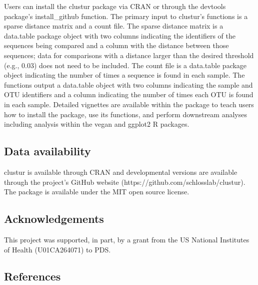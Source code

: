 \documentclass[
  11pt,
]{article}
\begin{document}
Users can install the clustur package via CRAN or through the devtools
package's install\_github function. The primary input to clustur's
functions is a sparse distance matrix and a count file. The sparse
distance matrix is a data.table package object with two columns
indicating the identifiers of the sequences being compared and a column
with the distance between those sequences; data for comparisons with a
distance larger than the desired threshold (e.g., 0.03) does not need to
be included. The count file is a data.table package object indicating
the number of times a sequence is found in each sample. The functions
output a data.table object with two columns indicating the sample and
OTU identifiers and a column indicating the number of times each OTU is
found in each sample. Detailed vignettes are available within the
package to teach users how to install the package, use its functions,
and perform downstream analyses including analysis within the vegan and
ggplot2 R packages.

\subsection{Data availability}\label{data-availability}

clustur is available through CRAN and developmental versions are
available through the project's GitHub website
(https://github.com/schlosslab/clustur). The package is available under
the MIT open source license.

\subsection{Acknowledgements}\label{acknowledgements}

This project was supported, in part, by a grant from the US National
Institutes of Health (U01CA264071) to PDS.

\newpage

\subsection{References}\label{references}
\end{document}
